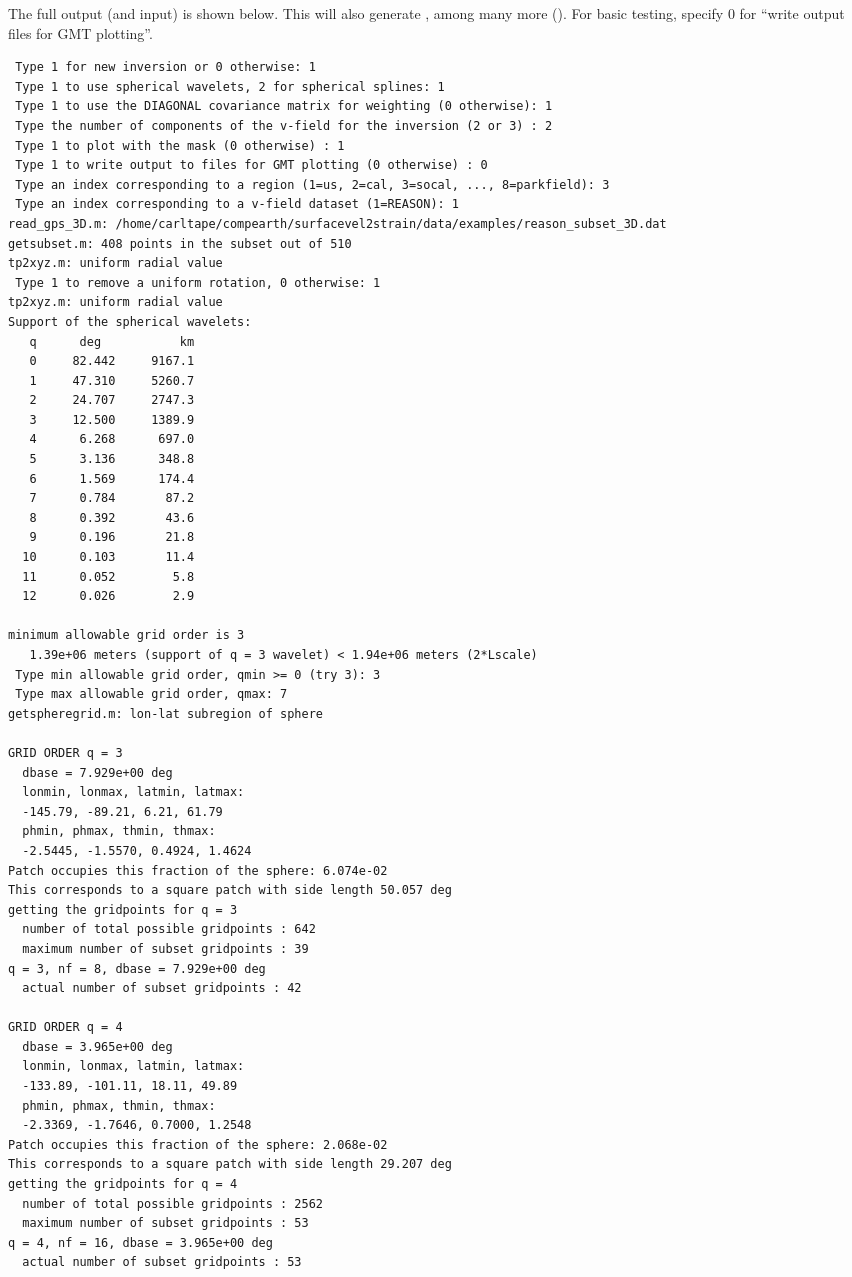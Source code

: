 \documentclass[11pt,titlepage,fleqn]{article}
\begin{document}
The full output (and input) is shown below. This will also generate , among many more (). For basic testing, specify 0 for ``write output files for GMT plotting''.
%
\begin{spacing}{1.0}
\begin{verbatim}
 Type 1 for new inversion or 0 otherwise: 1
 Type 1 to use spherical wavelets, 2 for spherical splines: 1
 Type 1 to use the DIAGONAL covariance matrix for weighting (0 otherwise): 1
 Type the number of components of the v-field for the inversion (2 or 3) : 2
 Type 1 to plot with the mask (0 otherwise) : 1
 Type 1 to write output to files for GMT plotting (0 otherwise) : 0
 Type an index corresponding to a region (1=us, 2=cal, 3=socal, ..., 8=parkfield): 3
 Type an index corresponding to a v-field dataset (1=REASON): 1
read_gps_3D.m: /home/carltape/compearth/surfacevel2strain/data/examples/reason_subset_3D.dat
getsubset.m: 408 points in the subset out of 510
tp2xyz.m: uniform radial value
 Type 1 to remove a uniform rotation, 0 otherwise: 1
tp2xyz.m: uniform radial value
Support of the spherical wavelets:
   q      deg           km
   0     82.442     9167.1
   1     47.310     5260.7
   2     24.707     2747.3
   3     12.500     1389.9
   4      6.268      697.0
   5      3.136      348.8
   6      1.569      174.4
   7      0.784       87.2
   8      0.392       43.6
   9      0.196       21.8
  10      0.103       11.4
  11      0.052        5.8
  12      0.026        2.9
  
minimum allowable grid order is 3
   1.39e+06 meters (support of q = 3 wavelet) < 1.94e+06 meters (2*Lscale)
 Type min allowable grid order, qmin >= 0 (try 3): 3
 Type max allowable grid order, qmax: 7
getspheregrid.m: lon-lat subregion of sphere
  
GRID ORDER q = 3
  dbase = 7.929e+00 deg
  lonmin, lonmax, latmin, latmax:
  -145.79, -89.21, 6.21, 61.79
  phmin, phmax, thmin, thmax:
  -2.5445, -1.5570, 0.4924, 1.4624
Patch occupies this fraction of the sphere: 6.074e-02
This corresponds to a square patch with side length 50.057 deg
getting the gridpoints for q = 3
  number of total possible gridpoints : 642
  maximum number of subset gridpoints : 39
q = 3, nf = 8, dbase = 7.929e+00 deg
  actual number of subset gridpoints : 42
  
GRID ORDER q = 4
  dbase = 3.965e+00 deg
  lonmin, lonmax, latmin, latmax:
  -133.89, -101.11, 18.11, 49.89
  phmin, phmax, thmin, thmax:
  -2.3369, -1.7646, 0.7000, 1.2548
Patch occupies this fraction of the sphere: 2.068e-02
This corresponds to a square patch with side length 29.207 deg
getting the gridpoints for q = 4
  number of total possible gridpoints : 2562
  maximum number of subset gridpoints : 53
q = 4, nf = 16, dbase = 3.965e+00 deg
  actual number of subset gridpoints : 53
  

\end{verbatim}
\end{spacing}
\end{document}
